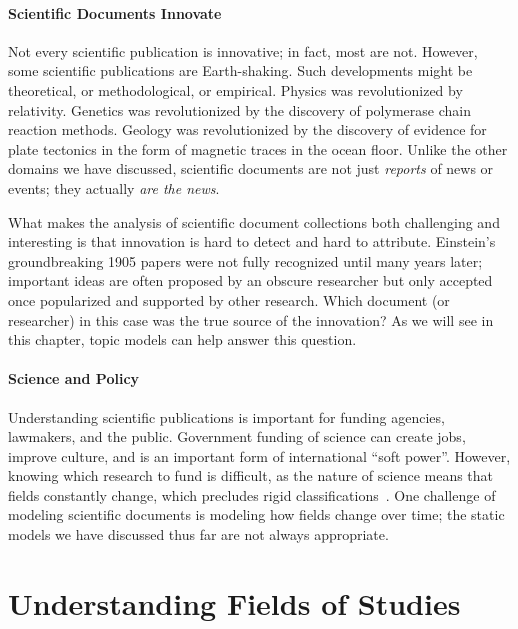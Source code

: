 \paragraph{Scientific Documents Innovate}

Not every scientific publication is innovative;
in fact, most are not.  However, some scientific publications are
Earth-shaking. Such developments might be theoretical, or methodological, or empirical.
Physics was revolutionized by relativity.
Genetics was revolutionized by the discovery of polymerase chain reaction methods.
Geology was revolutionized by the discovery of evidence for plate tectonics in the form of magnetic traces in the ocean floor. Unlike the other domains we have
discussed, scientific documents are not just \emph{reports} of news or events;
they actually \emph{are the news}.

What makes the analysis of scientific document collections both challenging and
interesting is that innovation is hard to detect and hard to attribute.
Einstein's groundbreaking 1905 papers were not fully recognized until many years
later; important ideas are often proposed by an obscure researcher but only accepted
once popularized and supported by other research. Which document (or researcher)
in this case was the true source of the innovation?  As we will see in this
chapter, topic models can help answer this question.

\paragraph{Science and Policy}

Understanding scientific publications is important for funding agencies,
lawmakers, and the public.  Government funding of science can create jobs,
improve culture, and is an important form of international ``soft power''.
However, knowing which research to fund is difficult, as the nature of science
means that fields constantly change, which precludes rigid
classifications~\citep{szostak-04}.  One challenge of modeling scientific
documents is modeling how fields change over time; the static models we have
discussed thus far are not always appropriate.

\section{Understanding Fields of Studies}
\label{sec:sci_fields}

